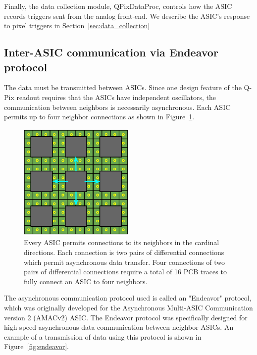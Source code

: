 Finally, the data collection module, QPixDataProc, controls how the ASIC records triggers sent from the analog front-end.
We describe the ASIC's response to pixel triggers in Section~\ref{sec:data_collection}


\subsection{Inter-ASIC communication via Endeavor protocol}\label{sec:endeavor}
The data must be transmitted between ASICs.
Since one design feature of the Q-Pix readout requires that the ASICs have independent oscillators, the communication between neighbors is necessarily asynchronous.
Each ASIC permits up to four neighbor connections as shown in Figure~\ref{fig:example_connections}.

\begin{figure}[]
\centering
\includegraphics[width=0.5\textwidth]{images/asic_neighbor_connections_qpix.png}
\caption{Every ASIC permits connections to its neighbors in the cardinal directions.
Each connection is two pairs of differential connections which permit asynchronous data transfer.
Four connections of two pairs of differential connections require a total of 16 PCB traces to fully connect an ASIC to four neighbors.
}
\label{fig:example_connections}
\end{figure}

The asynchronous communication protocol used is called an "Endeavor" protocol, which was originally developed for the Asynchronous Multi-ASIC Communication version 2 (AMACv2) ASIC.
The Endeavor protocol was specifically designed for high-speed asynchronous data communication between neighbor ASICs.
An example of a transmission of data using this protocol is shown in Figure~\ref{fig:endeavor}.

